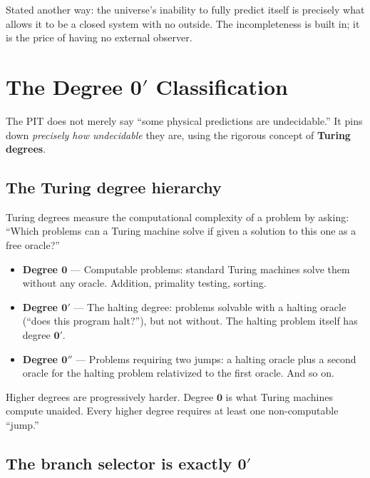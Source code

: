 \documentclass[11pt,a4paper]{article}
\newcommand{\term}[1]{\textbf{#1}}
\begin{document}
Stated another way: the universe's inability to fully predict itself is
precisely what allows it to be a closed system with no outside.
The incompleteness is built in; it is the price of having no external observer.

\section{The Degree $\mathbf{0}'$ Classification}

The PIT does not merely say ``some physical predictions are undecidable.''
It pins down \emph{precisely how undecidable} they are, using the rigorous concept of
\term{Turing degrees}.

\subsection{The Turing degree hierarchy}

Turing degrees measure the computational complexity of a problem by asking:
``Which problems can a Turing machine solve if given a solution to this one as a free
oracle?''

\begin{itemize}
\item \textbf{Degree $\mathbf{0}$} — Computable problems: standard Turing machines solve
  them without any oracle.  Addition, primality testing, sorting.

\item \textbf{Degree $\mathbf{0}'$} — The halting degree: problems solvable with a halting
  oracle (``does this program halt?''), but not without.  The halting problem itself
  has degree $\mathbf{0}'$.

\item \textbf{Degree $\mathbf{0}''$} — Problems requiring two jumps: a halting oracle
  plus a second oracle for the halting problem relativized to the first oracle.  And so on.
\end{itemize}

Higher degrees are progressively harder.  Degree $\mathbf{0}$ is what Turing machines
compute unaided.  Every higher degree requires at least one non-computable ``jump.''

\subsection{The branch selector is exactly $\mathbf{0}'$}
\end{document}
